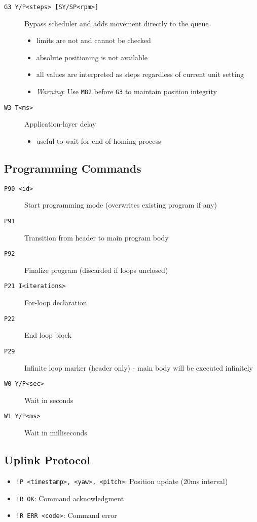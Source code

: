 \begin{description}
  \item[\texttt{G3 Y/P<steps> [SY/SP<rpm>]}] Bypass scheduler and adds movement directly to the queue
		\begin{itemize}
			\item limits are not and cannot be checked
			\item absolute positioning is not available
			\item all values are interpreted as steps regardless of current unit setting
			\item \textit{Warning}: Use \texttt{M82} before \texttt{G3} to maintain position integrity
		\end{itemize}
  \item[\texttt{W3 T<ms>}] Application-layer delay
		\begin{itemize}
			\item useful to wait for end of homing process
		\end{itemize}
\end{description}

\subsection*{Programming Commands}
\begin{description}
  \item[\texttt{P90 <id>}] Start programming mode (overwrites existing program if any)
  \item[\texttt{P91}] Transition from header to main program body
  \item[\texttt{P92}] Finalize program (discarded if loops unclosed)
  \item[\texttt{P21 I<iterations>}] For-loop declaration
  \item[\texttt{P22}] End loop block
  \item[\texttt{P29}] Infinite loop marker (header only) - main body will be executed infinitely
  \item[\texttt{W0 Y/P<sec>}] Wait in seconds
  \item[\texttt{W1 Y/P<ms>}] Wait in milliseconds
\end{description}


\subsection*{Uplink Protocol}

\begin{itemize}
  \item \texttt{!P <timestamp>, <yaw>, <pitch>}: Position update (20ms interval)
  \item \texttt{!R OK}: Command acknowledgment
  \item \texttt{!R ERR <code>}: Command error
\end{itemize}

